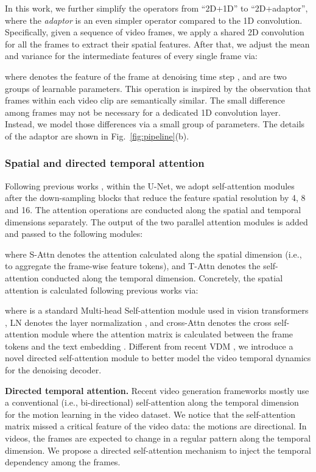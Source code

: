 \documentclass[10pt,twocolumn,letterpaper]{article}
\newcommand{\myPara}[1]{\vspace{6pt}\noindent\textbf{#1}}
\begin{document}
In this work, we further simplify the operators  from ``2D+1D'' to ``2D+adaptor'', where the \textit{adaptor} is an even simpler operator compared to the 1D convolution. Specifically, given a sequence of  video frames, we apply a {shared} 2D convolution for all the frames to extract their spatial features. After that, we adjust the mean and variance for the intermediate features of every single frame via: 

where  denotes the feature of the  frame at denoising time step , and    are two groups of learnable parameters. This operation is inspired by the observation that frames within each video clip are semantically similar. The small difference among frames may not be necessary for a dedicated 1D convolution layer. Instead, we model those differences via a small group of parameters. The details    of the adaptor  are shown in Fig.~\ref{fig:pipeline}(b).


\subsubsection{Spatial and  directed temporal attention}
\label{subsubsec:temp_attn}
Following previous works \cite{dalle2, imagen, ho_video_2022}, within the U-Net, we adopt self-attention modules after the down-sampling blocks that reduce the feature spatial resolution  by 4, 8  and 16. The attention operations are conducted along the spatial and temporal dimensions separately. The output of the two parallel attention modules is added and passed to the following modules:

 where S-Attn denotes the attention calculated along the spatial dimension (i.e., to aggregate the frame-wise feature tokens), and T-Attn denotes the self-attention conducted along the temporal dimension. Concretely, the spatial attention is calculated following previous works \cite{imagen, dalle2} via:

where  is a standard Multi-head  Self-attention module used in vision transformers \cite{dosovitskiy2020image, zhou2022understanding}, LN denotes the layer normalization \cite{ba2016layer}, and cross-Attn denotes the cross self-attention module where the attention matrix is calculated between the frame tokens  and the text embedding . Different from recent VDM \cite{ho_video_2022}, 
we introduce a novel directed self-attention module to better model the video temporal dynamics for the denoising decoder. 


\myPara{Directed temporal attention.}
Recent video generation frameworks \cite{singer_make--video_2022, ho_video_2022} mostly use a conventional (i.e., bi-directional) self-attention along the temporal dimension for the motion learning in the video dataset. We notice that the self-attention matrix missed a critical feature of the video data: the motions are directional. In videos, the frames are expected to change in a regular pattern along the temporal dimension. We propose a directed self-attention mechanism to inject the temporal dependency among the frames.
\end{document}
